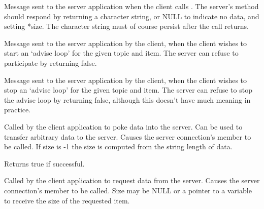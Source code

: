 
Message sent to the server application when the client calls 
. The
server's  method
should respond by returning a character string, or NULL to
indicate no data, and setting *size. The character string must of
course persist after the call returns.

\label{wxconnectiononstartadvise}


Message sent to the server application by the client, when the client
wishes to start an `advise loop' for the given topic and item. The
server can refuse to participate by returning false.

\label{wxconnectiononstopadvise}


Message sent to the server application by the client, when the client
wishes to stop an `advise loop' for the given topic and item. The
server can refuse to stop the advise loop by returning false, although
this doesn't have much meaning in practice.

\label{wxconnectionpoke}


Called by the client application to poke data into the server.
Can be used to transfer arbitrary data to the server. Causes the
server connection's  member to
be called. If size is -1 the size is computed from the string
length of data.

Returns true if successful.

\label{wxconnectionrequest}


Called by the client application to request data from the server.
Causes the server connection's  
member to be called. Size may be NULL or a pointer to a variable
to receive the size of the requested item.

